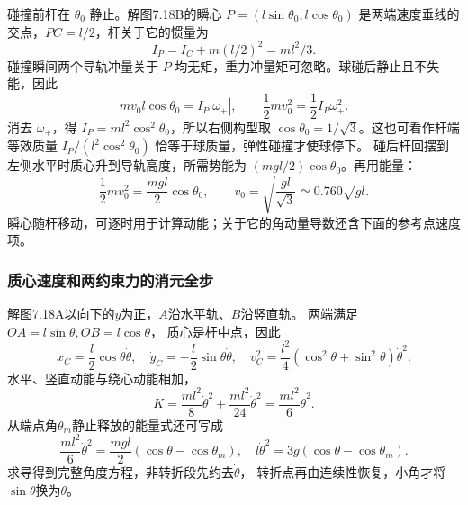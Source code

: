 \documentclass[UTF8,fontset=fandol,a4paper,11pt]{ctexart}
\newcommand{\figcaption}[1]{\par\vspace{2pt}{\small\color{muted}#1}\par}
\begin{document}
\begin{center}\begin{minipage}{\linewidth}\centering{}\figcaption{解图 7.18B}\end{minipage}\end{center}
碰撞前杆在 $\theta_0$ 静止。解图7.18B的瞬心 $P=(l\sin\theta_0,l\cos\theta_0)$ 是两端速度垂线的交点，$PC=l/2$，杆关于它的惯量为
\[I_P=I_C+m(l/2)^2=ml^2/3.\]
碰撞瞬间两个导轨冲量关于 $P$ 均无矩，重力冲量矩可忽略。球碰后静止且不失能，因此
\[mv_0l\cos\theta_0=I_P|\omega_+|,\qquad
\frac12mv_0^2=\frac12I_P\omega_+^2.\]
消去 $\omega_+$，得 $I_P=ml^2\cos^2\theta_0$，所以右侧构型取 $\cos\theta_0=1/\sqrt3$。这也可看作杆端等效质量 $I_P/(l^2\cos^2\theta_0)$ 恰等于球质量，弹性碰撞才使球停下。
碰后杆回摆到左侧水平时质心升到导轨高度，所需势能为 $(mgl/2)\cos\theta_0$。再用能量：
\[\frac12mv_0^2=\frac{mgl}{2}\cos\theta_0,\qquad
\boxed{v_0=\sqrt{\frac{gl}{\sqrt3}}\simeq0.760\sqrt{gl}.}\]
瞬心随杆移动，可逐时用于计算动能；关于它的角动量导数还含下面的参考点速度项。
\subsubsection*{质心速度和两约束力的消元全步}
解图7.18A以向下的$y$为正，$A$沿水平轨、$B$沿竖直轨。
两端满足$OA=l\sin\theta,OB=l\cos\theta$，
质心是杆中点，因此
\[
\dot x_C=\frac l2\cos\theta\dot\theta,
\quad\dot y_C=-\frac l2\sin\theta\dot\theta,
\quad v_C^2=\frac{l^2}{4}(\cos^2\theta+\sin^2\theta)\dot\theta^2.
\]
水平、竖直动能与绕心动能相加，
\[
K=\frac{ml^2}{8}\dot\theta^2+\frac{ml^2}{24}\dot\theta^2
=\frac{ml^2}{6}\dot\theta^2.
\]
从端点角$\theta_m$静止释放的能量式还可写成
\[
\frac{ml^2}{6}\dot\theta^2=\frac{mgl}{2}(\cos\theta-\cos\theta_m),
\quad l\dot\theta^2=3g(\cos\theta-\cos\theta_m).
\]
求导得到完整角度方程，非转折段先约去$\dot\theta$，
转折点再由连续性恢复，小角才将$\sin\theta$换为$\theta$。
\end{document}
